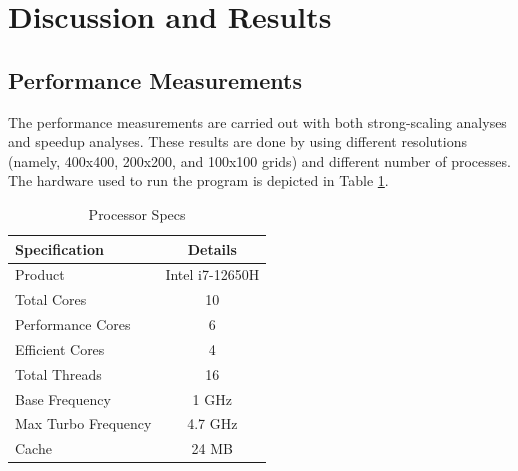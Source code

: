 \documentclass[12pt]{article}
\begin{document}
\newpage
\section{Discussion and Results}
\subsection{Performance Measurements}

The performance measurements are carried out with both strong-scaling analyses and speedup analyses. These results are done by using different resolutions (namely, 400x400, 200x200, and 100x100 grids) and different number of processes. The hardware used to run the program is depicted in Table \ref{tab:spec}.
\begin{table}[H]
\centering
\caption{Processor Specs}
\label{tab:spec}
\begin{tabular}{lc}
\toprule
\textbf{Specification} & \textbf{Details} \\
\midrule
Product & Intel i7-12650H \\
Total Cores & 10 \\
Performance Cores & 6 \\
Efficient Cores & 4 \\
Total Threads & 16 \\
Base Frequency & 1 GHz\\
Max Turbo Frequency & 4.7 GHz \\
Cache & 24 MB \\
\bottomrule
\end{tabular}
\end{table}
\newpage
\end{document}
